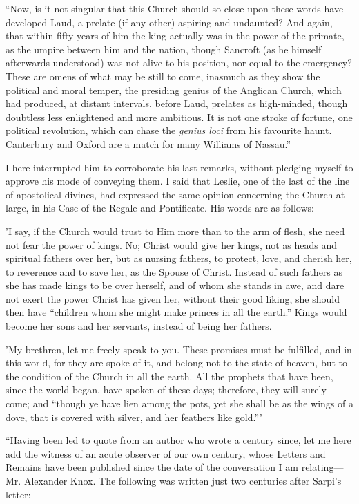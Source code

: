 ``Now, is it not singular that this Church should
so close upon these words have developed Laud, a prelate (if any
other) aspiring and undaunted? And again, that within fifty years of
him the king actually was in the power of the primate, as the umpire
between him and the nation, though Sancroft (as he himself afterwards
understood) was not alive to his position, nor equal to the emergency?
These are omens of what may be still to come, inasmuch as they show
the political and moral temper, the presiding genius of the Anglican
Church, which had produced, at distant intervals, before Laud,
prelates as high-minded, though doubtless less enlightened and more
ambitious. It is not one stroke of fortune, one political revolution,
which can chase the \emph{genius loci} from his favourite haunt.
Canterbury and Oxford are a match for many Williams of Nassau.''

I here interrupted him to corroborate his last
remarks, without pledging myself to approve his mode of conveying
them. I said that Leslie, one of the last of the line of
apostolical divines, had expressed the same opinion concerning the
Church at large, in his Case of the Regale and Pontificate. His words
are as follows:

'I say, if the
Church would trust to Him more than to the arm of flesh, she need not
fear the power of kings. No; Christ would give her kings, not as heads
and spiritual fathers over her, but as nursing fathers, to protect,
love, and cherish her, to reverence and to save her, as the Spouse of
Christ. Instead of such fathers as she has made kings to be over
herself, and of whom she stands in awe, and dare not exert the power
Christ has given her, without their good liking, she should then have ``children
whom she might make princes in all the earth.'' Kings would become her
sons and her servants, instead of being her fathers.

'My brethren, let
me freely speak to you. These promises must be fulfilled, and in this
world, for they are spoke of it, and belong not to the state of
heaven, but to the condition of the Church in all the earth. All the
prophets that have been, since the world began, have spoken of these
days; therefore, they will surely come; and ``though ye have lien among
the pots, yet she shall be as the wings of a dove, that is covered
with silver, and her feathers like gold.'''

``Having been led to quote from an author who
wrote a century since, let me here add the witness of an acute
observer of our own century, whose Letters and Remains have been
published since the date of the conversation I am relating—Mr.
Alexander Knox. The following was written just two centuries after
Sarpi's letter:

